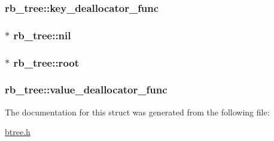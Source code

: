 \subsubsection[{key\+\_\+deallocator\+\_\+func}]{ rb\+\_\+tree\+::key\+\_\+deallocator\+\_\+func}\label{structrb__tree_a4c2d24d8fd4d72dcd2dc44fd9162da41}
\hypertarget{structrb__tree_ab7b455b147b333e094aa204ee7db6011}{}
\subsubsection[{nil}]{$\ast$ rb\+\_\+tree\+::nil}\label{structrb__tree_ab7b455b147b333e094aa204ee7db6011}
\hypertarget{structrb__tree_a360821baa8346c8daa0ed28665a010e5}{}
\subsubsection[{root}]{$\ast$ rb\+\_\+tree\+::root}\label{structrb__tree_a360821baa8346c8daa0ed28665a010e5}
\hypertarget{structrb__tree_a287af0a50e7abbfe60cfac5cb38f9bdf}{}
\subsubsection[{value\+\_\+deallocator\+\_\+func}]{ rb\+\_\+tree\+::value\+\_\+deallocator\+\_\+func}\label{structrb__tree_a287af0a50e7abbfe60cfac5cb38f9bdf}


The documentation for this struct was generated from the following file\+:\begin{DoxyCompactItemize}
\item 
\hyperlink{btree_8h}{btree.\+h}\end{DoxyCompactItemize}
